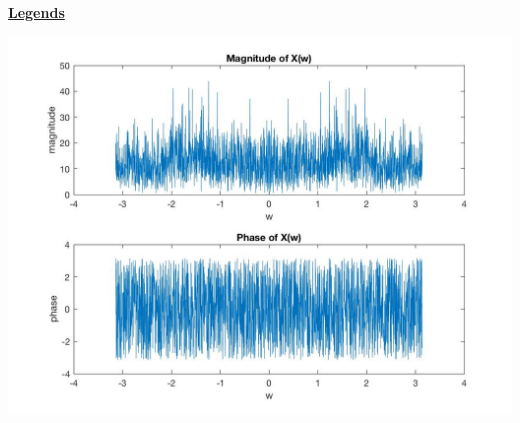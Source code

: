\documentclass{article}
\begin{document}
  \color{red}
  \underline{\textbf{Legends}}
  \color{black}

\includegraphics[scale=.5]{Legends1}
\end{document}
